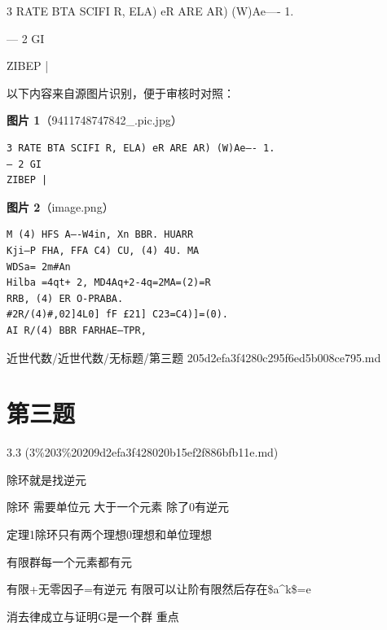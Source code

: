 \begin{homework}

3 RATE BTA SCIFI R, ELA) eR ARE AR) (W)Ae—- 1.

— 2 GI

ZIBEP |

\end{homework}

\begin{note}
以下内容来自源图片识别，便于审核时对照：

\textbf{图片 1}（9411748747842\_.pic.jpg）
\begin{Verbatim}[fontsize=\small]
3 RATE BTA SCIFI R, ELA) eR ARE AR) (W)Ae—- 1.
— 2 GI
ZIBEP |
\end{Verbatim}

\textbf{图片 2}（image.png）
\begin{Verbatim}[fontsize=\small]
M (4) HFS A—-W4in, Xn BBR. HUARR
Kji—P FHA, FFA C4) CU, (4) 4U. MA
WDSa= 2m#An
Hilba =4qt+ 2, MD4Aq+2-4q=2MA=(2)=R
RRB, (4) ER O-PRABA.
#2R/(4)#,02]4L0] fF £21] C23=C4)]=(0).
AI R/(4) BBR FARHAE—TPR,
\end{Verbatim}

\end{note}

\begin{note}[来源路径]

近世代数/近世代数/无标题/第三题 205d2efa3f4280c295f6ed5b008ce795.md

\end{note}

\section*{第三题}

\begin{note}[来源上级主题]

3.3 (3\%203\%20209d2efa3f428020b15ef2f886bfb11e.md)

\end{note}

\begin{homework}

除环就是找逆元

除环 需要单位元 大于一个元素 除了0有逆元

定理1除环只有两个理想0理想和单位理想

有限群每一个元素都有元

有限+无零因子=有逆元 有限可以让阶有限然后存在\$a\textasciicircum{}k\$=e

消去律成立与证明G是一个群 重点

\end{homework}

